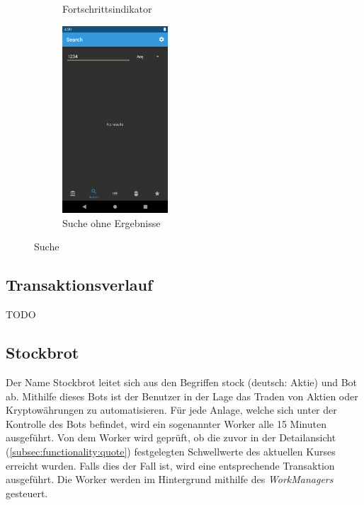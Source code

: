 \documentclass[a4paper]{article}
\begin{document}
\begin{figure}[H]
\begin{subfigure}{.5\textwidth}
		\caption{Fortschrittsindikator}
		\label{fig:functionality:search:overview:loading}
	\end{subfigure}
	\begin{subfigure}{.5\textwidth}
		\centering
		\includegraphics[height=7cm,keepaspectratio]{./images/search_no_results.png}
		\caption{Suche ohne Ergebnisse}
		\label{fig:functionality:search:overview:no-results}
	\end{subfigure}
	\caption{Suche}
	\label{fig:functionality:search:overview}
\end{figure}


\subsection{Transaktionsverlauf}
\label{subsec:functionality:history}
TODO


\subsection{Stockbrot}
\label{subsec:functionality:stockbrot}
Der Name Stockbrot leitet sich aus den Begriffen stock (deutsch: Aktie) und Bot ab. Mithilfe dieses Bots ist der Benutzer in der Lage das Traden von Aktien oder Kryptowährungen zu automatisieren. Für jede Anlage, welche sich unter der Kontrolle des Bots befindet, wird ein sogenannter Worker alle 15 Minuten ausgeführt. Von dem Worker wird geprüft, ob die zuvor in der Detailansicht (\autoref{subsec:functionality:quote}) festgelegten Schwellwerte des aktuellen Kurses erreicht wurden. Falls dies der Fall ist, wird eine entsprechende Transaktion ausgeführt. Die Worker werden im Hintergrund mithilfe des \textit{WorkManagers} gesteuert.
\end{document}
